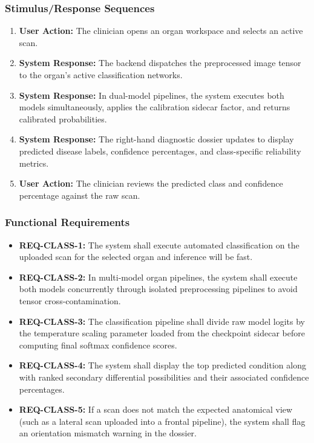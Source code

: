 \documentclass[12pt,a4paper]{report}
\begin{document}
\subsubsection{Stimulus/Response Sequences}
\begin{enumerate}
    \item \textbf{User Action:} The clinician opens an organ workspace and selects an active scan.
    \item \textbf{System Response:} The backend dispatches the preprocessed image tensor to the organ's active classification networks.
    \item \textbf{System Response:} In dual-model pipelines, the system executes both models simultaneously, applies the calibration sidecar factor, and returns calibrated probabilities.
    \item \textbf{System Response:} The right-hand diagnostic dossier updates to display predicted disease labels, confidence percentages, and class-specific reliability metrics.
    \item \textbf{User Action:} The clinician reviews the predicted class and confidence percentage against the raw scan.
\end{enumerate}

\subsubsection{Functional Requirements}
\begin{itemize}
    \item \textbf{REQ-CLASS-1:} The system shall execute automated classification on the uploaded scan for the selected organ and inference will be fast.
    \item \textbf{REQ-CLASS-2:} In multi-model organ pipelines, the system shall execute both models concurrently through isolated preprocessing pipelines to avoid tensor cross-contamination.
    \item \textbf{REQ-CLASS-3:} The classification pipeline shall divide raw model logits by the temperature scaling parameter loaded from the checkpoint sidecar before computing final softmax confidence scores.
    \item \textbf{REQ-CLASS-4:} The system shall display the top predicted condition along with ranked secondary differential possibilities and their associated confidence percentages.
    \item \textbf{REQ-CLASS-5:} If a scan does not match the expected anatomical view (such as a lateral scan uploaded into a frontal pipeline), the system shall flag an orientation mismatch warning in the dossier.
\end{itemize}
\end{document}
